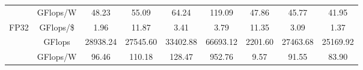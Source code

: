 \begin{table}[]
\begin{adjustwidth}{-1.0in}{-1.0in}
\begin{center}
{\begin{tabular}{cc||c|c|c|c|c|c|c}
                                  & GFlops/W                                                                               & 48.23                                                           & 55.09                                                            & 64.24                                                                & 119.09                                                        & 47.86                                                                & 45.77                                                                  & 41.95                                                                  \\
\multirow{-3}{*}{FP32}            & \cellcolor[HTML]{EFEFEF}GFlops/\$                                                      & \cellcolor[HTML]{EFEFEF}1.96                                    & \cellcolor[HTML]{EFEFEF}11.87                                    & \cellcolor[HTML]{EFEFEF}3.41                                         & \cellcolor[HTML]{EFEFEF}3.79                                  & \cellcolor[HTML]{EFEFEF}11.35                                        & \cellcolor[HTML]{EFEFEF}3.09                                           & \cellcolor[HTML]{EFEFEF}1.37                                           \\ \hline
                                  & GFlops                                                                                 & 28938.24                                                        & 27545.60                                                         & 33402.88                                                             & 66693.12                                                      & 2201.60                                                              & 27463.68                                                               & 25169.92                                                               \\
                                  & \cellcolor[HTML]{EFEFEF}GFlops/W                                                       & \cellcolor[HTML]{EFEFEF}96.46                                   & \cellcolor[HTML]{EFEFEF}110.18                                   & \cellcolor[HTML]{EFEFEF}128.47                                       & \cellcolor[HTML]{EFEFEF}952.76                                & \cellcolor[HTML]{EFEFEF}9.57                                         & \cellcolor[HTML]{EFEFEF}91.55                                          & \cellcolor[HTML]{EFEFEF}83.90                                          \\

\end{tabular}}
\end{center}
\end{adjustwidth}
\end{table}
